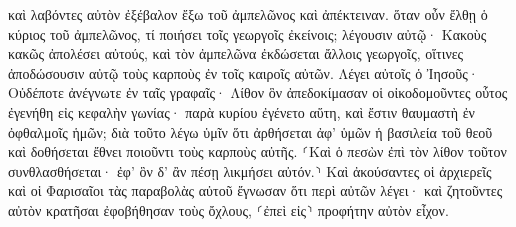 \documentclass{openreader}
\begin{document}
καὶ λαβόντες αὐτὸν ἐξέβαλον ἔξω τοῦ ἀμπελῶνος καὶ ἀπέκτειναν. 
ὅταν οὖν ἔλθῃ ὁ κύριος τοῦ ἀμπελῶνος, τί ποιήσει τοῖς γεωργοῖς ἐκείνοις; 
λέγουσιν αὐτῷ· Κακοὺς κακῶς ἀπολέσει αὐτούς, καὶ τὸν ἀμπελῶνα ἐκδώσεται ἄλλοις γεωργοῖς, οἵτινες ἀποδώσουσιν αὐτῷ τοὺς καρποὺς ἐν τοῖς καιροῖς αὐτῶν. 
Λέγει αὐτοῖς ὁ Ἰησοῦς· Οὐδέποτε ἀνέγνωτε ἐν ταῖς γραφαῖς· Λίθον ὃν ἀπεδοκίμασαν οἱ οἰκοδομοῦντες οὗτος ἐγενήθη εἰς κεφαλὴν γωνίας· παρὰ κυρίου ἐγένετο αὕτη, καὶ ἔστιν θαυμαστὴ ἐν ὀφθαλμοῖς ἡμῶν; 
διὰ τοῦτο λέγω ὑμῖν ὅτι ἀρθήσεται ἀφ’ ὑμῶν ἡ βασιλεία τοῦ θεοῦ καὶ δοθήσεται ἔθνει ποιοῦντι τοὺς καρποὺς αὐτῆς. 
⸂Καὶ ὁ πεσὼν ἐπὶ τὸν λίθον τοῦτον συνθλασθήσεται· ἐφ’ ὃν δ’ ἂν πέσῃ λικμήσει αὐτόν.⸃ 
Καὶ ἀκούσαντες οἱ ἀρχιερεῖς καὶ οἱ Φαρισαῖοι τὰς παραβολὰς αὐτοῦ ἔγνωσαν ὅτι περὶ αὐτῶν λέγει· 
καὶ ζητοῦντες αὐτὸν κρατῆσαι ἐφοβήθησαν τοὺς ὄχλους, ⸂ἐπεὶ εἰς⸃ προφήτην αὐτὸν εἶχον. 
\end{document}
